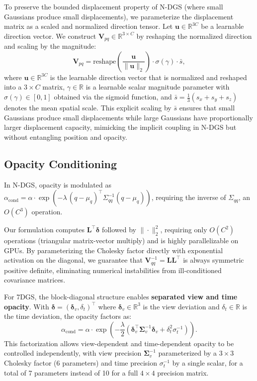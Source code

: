 \documentclass{article}
\begin{document}
To preserve the bounded displacement property of N-DGS (where small Gaussians produce small displacements), we parameterize the displacement matrix as a scaled and normalized direction tensor. Let $\mathbf{u} \in \mathbb{R}^{3C}$ be a learnable direction vector. We construct $\mathbf{V}_{pq} \in \mathbb{R}^{3 \times C}$ by reshaping the normalized direction and scaling by the magnitude:
\begin{equation}
\mathbf{V}_{pq} = \text{reshape}\left(\frac{\mathbf{u}}{\|\mathbf{u}\|_2}\right) \cdot \sigma(\gamma) \cdot \bar{s},
\end{equation}
where $\mathbf{u} \in \mathbb{R}^{3C}$ is the learnable direction vector that is normalized and reshaped into a $3 \times C$ matrix, $\gamma \in \mathbb{R}$ is a learnable scalar magnitude parameter with $\sigma(\gamma) \in [0, 1]$ obtained via the sigmoid function, and $\bar{s} = \frac{1}{3}(s_x + s_y + s_z)$ denotes the mean spatial scale. This explicit scaling by $\bar{s}$ ensures that small Gaussians produce small displacements while large Gaussians have proportionally larger displacement capacity, mimicking the implicit coupling in N-DGS but without entangling position and opacity.

\subsection{Opacity Conditioning}

In N-DGS, opacity is modulated as $\alpha_{\text{cond}} = \alpha \cdot \exp(-\lambda\,(q-\mu_q)^\top \Sigma_{qq}^{-1}(q-\mu_q))$, requiring the inverse of $\Sigma_{qq}$, an $O(C^3)$ operation.

Our formulation computes $\mathbf{L}^\top \boldsymbol{\delta}$ followed by $\|\cdot\|_2^2$, requiring only $O(C^2)$ operations (triangular matrix-vector multiply) and is highly parallelizable on GPUs. By parameterizing the Cholesky factor directly with exponential activation on the diagonal, we guarantee that $\mathbf{V}_{qq}^{-1} = \mathbf{L}\mathbf{L}^\top$ is always symmetric positive definite, eliminating numerical instabilities from ill-conditioned covariance matrices.

For 7DGS, the block-diagonal structure enables \textbf{separated view and time opacity}. With $\boldsymbol{\delta} = (\boldsymbol{\delta}_v, \delta_t)^\top$ where $\boldsymbol{\delta}_v \in \mathbb{R}^3$ is the view deviation and $\delta_t \in \mathbb{R}$ is the time deviation, the opacity factors as:
\begin{equation}
\alpha_{\text{cond}} = \alpha \cdot \exp\left(-\frac{\lambda}{2}\left(\boldsymbol{\delta}_v^\top \mathbf{\Sigma}_v^{-1} \boldsymbol{\delta}_v + \delta_t^2 \sigma_t^{-1}\right)\right).
\end{equation}
This factorization allows view-dependent and time-dependent opacity to be controlled independently, with view precision $\mathbf{\Sigma}_v^{-1}$ parameterized by a $3 \times 3$ Cholesky factor (6 parameters) and time precision $\sigma_t^{-1}$ by a single scalar, for a total of 7 parameters instead of 10 for a full $4 \times 4$ precision matrix.
\end{document}
